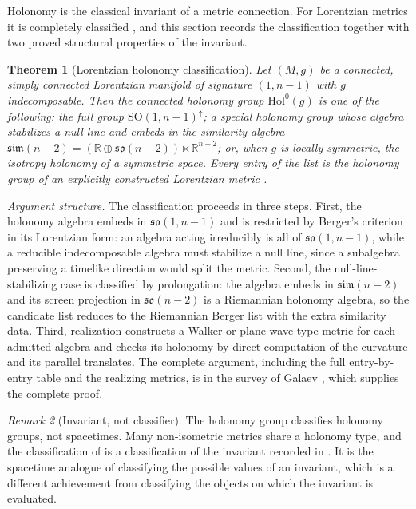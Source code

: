 \documentclass[11pt,letterpaper]{article}
\newtheorem{theorem}{Theorem}[section]
\theoremstyle{definition}
\theoremstyle{remark}
\newtheorem{remark}[theorem]{Remark}
\begin{document}
Holonomy is the classical invariant of a metric connection. For Lorentzian metrics it is completely classified \cite{galaev}, and this section records the classification together with two proved structural properties of the invariant.

\begin{theorem}[Lorentzian holonomy classification]\label{thm:holonomy}
Let $(M,g)$ be a connected, simply connected Lorentzian manifold of signature $(1,n-1)$ with $g$ indecomposable. Then the connected holonomy group $\mathrm{Hol}^0(g)$ is one of the following: the full group $\mathrm{SO}(1,n-1)^{\uparrow}$; a special holonomy group whose algebra stabilizes a null line and embeds in the similarity algebra $\mathfrak{sim}(n-2) = (\mathbb{R} \oplus \mathfrak{so}(n-2)) \ltimes \mathbb{R}^{n-2}$; or, when $g$ is locally symmetric, the isotropy holonomy of a symmetric space. Every entry of the list is the holonomy group of an explicitly constructed Lorentzian metric \cite{galaev}.
\end{theorem}

\par\medskip\noindent\emph{Argument structure.}
The classification proceeds in three steps. First, the holonomy algebra embeds in $\mathfrak{so}(1,n-1)$ and is restricted by Berger's criterion in its Lorentzian form: an algebra acting irreducibly is all of $\mathfrak{so}(1,n-1)$, while a reducible indecomposable algebra must stabilize a null line, since a subalgebra preserving a timelike direction would split the metric. Second, the null-line-stabilizing case is classified by prolongation: the algebra embeds in $\mathfrak{sim}(n-2)$ and its screen projection in $\mathfrak{so}(n-2)$ is a Riemannian holonomy algebra, so the candidate list reduces to the Riemannian Berger list with the extra similarity data. Third, realization constructs a Walker or plane-wave type metric for each admitted algebra and checks its holonomy by direct computation of the curvature and its parallel translates. The complete argument, including the full entry-by-entry table and the realizing metrics, is in the survey of Galaev \cite{galaev}, which supplies the complete proof.
\par\medskip

\begin{remark}[Invariant, not classifier]\label{rem:holonomyinvariant}
The holonomy group classifies holonomy groups, not spacetimes. Many non-isometric metrics share a holonomy type, and the classification of  is a classification of the invariant recorded in . It is the spacetime analogue of classifying the possible values of an invariant, which is a different achievement from classifying the objects on which the invariant is evaluated.
\end{remark}
\end{document}
